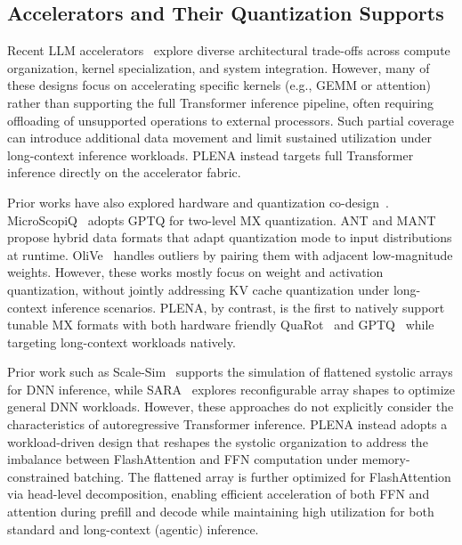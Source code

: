 \subsection{Accelerators and Their Quantization Supports}
\label{sec:accelerators}

Recent LLM accelerators~\cite{picachu, Microscopiq, FlightLLM, TENDER, FIGNA, Tandem, guo2023olive, hu2025mant, guo2022ant} explore diverse architectural trade-offs across compute organization, kernel specialization, and system integration. However, many of these designs focus on accelerating specific kernels (e.g., GEMM or attention) rather than supporting the full Transformer inference pipeline, often requiring offloading of unsupported operations to external processors. Such partial coverage can introduce additional data movement and limit sustained utilization under long-context inference workloads. PLENA instead targets full Transformer inference directly on the accelerator fabric.

Prior works have also explored hardware and quantization
co-design~\cite{zadeh2020gobo, guo2022ant, guo2023olive, Microscopiq,
hu2025mant}. MicroScopiQ~\cite{Microscopiq} adopts GPTQ for two-level
MX quantization. ANT and MANT~\cite{guo2022ant, hu2025mant} propose
hybrid data formats that adapt quantization mode to input distributions
at runtime. OliVe~\cite{guo2023olive} handles outliers by pairing them
with adjacent low-magnitude weights. However, these
works mostly focus on weight and activation quantization, without
jointly addressing KV cache quantization under long-context inference
scenarios. PLENA, by contrast, is the
first to natively support tunable MX formats with both
hardware friendly QuaRot~\cite{QuaRot} and GPTQ~\cite{frantar2022gptq} while
targeting long-context workloads natively.

Prior work such as Scale-Sim~\cite{samajdar2018scale} supports the simulation of flattened systolic arrays for DNN inference, while SARA~\cite{SARA} explores reconfigurable array shapes to optimize general DNN workloads. However, these approaches do not explicitly consider the characteristics of autoregressive Transformer inference. PLENA instead adopts a workload-driven design that reshapes the systolic organization to address the imbalance between FlashAttention and FFN computation under memory-constrained batching. The flattened array is further optimized for FlashAttention via head-level decomposition, enabling efficient acceleration of both FFN and attention during prefill and decode while maintaining high utilization for both standard and long-context (agentic) inference.

